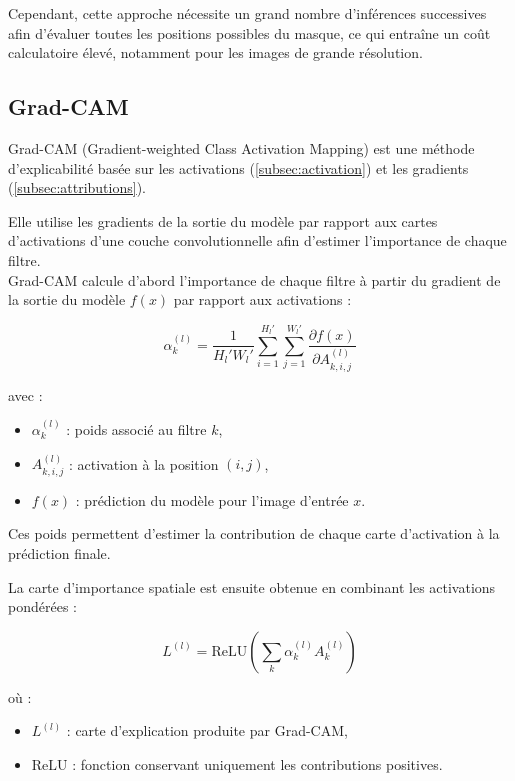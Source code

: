 \documentclass{ir}
\begin{document}
Cependant, cette approche nécessite un grand nombre d'inférences successives afin d'évaluer toutes les positions possibles du masque, ce qui entraîne un coût calculatoire élevé, notamment pour les images de grande résolution.\\
\cite{zeiler2014visualizing}

\subsection{Grad-CAM}\label{subsec:gc}

Grad-CAM (Gradient-weighted Class Activation Mapping) est une méthode d'explicabilité basée sur les activations (\ref{subsec:activation}) et les gradients (\ref{subsec:attributions}).

Elle utilise les gradients de la sortie du modèle par rapport aux cartes d'activations d'une couche convolutionnelle afin d'estimer l'importance de chaque filtre.\\

Grad-CAM calcule d'abord l'importance de chaque filtre à partir du gradient de la sortie du modèle $f(x)$ par rapport aux activations :

\begin{equation}
\alpha_k^{(l)} =
\frac{1}{H_l' W_l'}
\sum_{i=1}^{H_l'}
\sum_{j=1}^{W_l'}
\frac{\partial f(x)}{\partial A_{k,i,j}^{(l)}}
\end{equation}

avec :
\begin{itemize}
    \item $\alpha_k^{(l)}$ : poids associé au filtre $k$,
    \item $A_{k,i,j}^{(l)}$ : activation à la position $(i,j)$,
    \item $f(x)$ : prédiction du modèle pour l'image d'entrée $x$.\\
\end{itemize}

Ces poids permettent d'estimer la contribution de chaque carte d'activation à la prédiction finale.

La carte d'importance spatiale est ensuite obtenue en combinant les activations pondérées :

\begin{equation}
L^{(l)} =
\mathrm{ReLU}
\left(
\sum_k
\alpha_k^{(l)} A_k^{(l)}
\right)
\end{equation}

où :
\begin{itemize}
    \item $L^{(l)}$ : carte d'explication produite par Grad-CAM,
    \item $\mathrm{ReLU}$ : fonction conservant uniquement les contributions positives.\\
\end{itemize}
\end{document}
